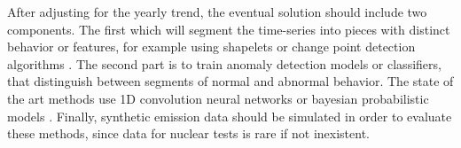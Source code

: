 \documentclass{article}
\begin{document}
After adjusting for the yearly trend, the eventual solution should include two components. The first which will segment the time-series into pieces with distinct behavior or features, for example using shapelets \cite{10.1145/2623330.2623613}\cite{10.1007/978-3-030-39098-3_7} or change point detection algorithms \cite{TRUONG2020107299}. The second part is to train anomaly detection models or classifiers, that distinguish between segments of normal and abnormal behavior. The state of the art methods use 1D convolution neural networks \cite{KIRANYAZ2021107398} or bayesian probabilistic models \cite{https://doi.org/10.48550/arxiv.1902.08627}. Finally, synthetic emission data should be simulated in order to evaluate these methods, since data for nuclear tests is rare if not inexistent.

    
\printbibliography
\end{document}
